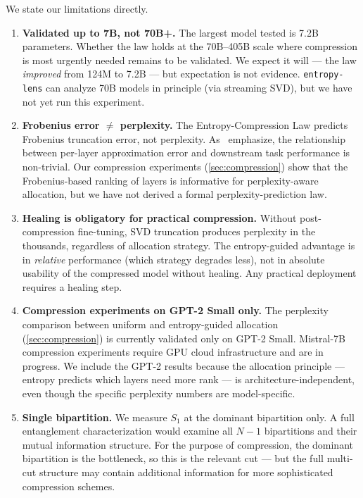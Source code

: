 \documentclass[11pt,a4paper]{article}
\newcommand{\Svn}{S_1}
\begin{document}
We state our limitations directly.

\begin{enumerate}[leftmargin=2em, itemsep=3pt]
  \item \textbf{Validated up to 7B, not 70B+.}
    The largest model tested is 7.2B parameters.  Whether the law
    holds at the 70B--405B scale where compression is most urgently
    needed remains to be validated.  We expect it will --- the law
    \emph{improved} from 124M to 7.2B --- but expectation is not
    evidence.  \texttt{entropy-lens} can analyze 70B models in
    principle (via streaming SVD), but we have not yet run this
    experiment.

  \item \textbf{Frobenius error $\neq$ perplexity.}
    The Entropy-Compression Law predicts Frobenius truncation error,
    not perplexity.  As~\citet{hsu2025rethinking} emphasize, the
    relationship between per-layer approximation error and downstream
    task performance is non-trivial.  Our compression experiments
    (\cref{sec:compression}) show that the Frobenius-based ranking
    of layers is informative for perplexity-aware allocation, but we
    have not derived a formal perplexity-prediction law.

  \item \textbf{Healing is obligatory for practical compression.}
    Without post-compression fine-tuning, SVD truncation produces
    perplexity in the thousands, regardless of allocation strategy.
    The entropy-guided advantage is in \emph{relative} performance
    (which strategy degrades less), not in absolute usability of the
    compressed model without healing.  Any practical deployment
    requires a healing step.

  \item \textbf{Compression experiments on GPT-2 Small only.}
    The perplexity comparison between uniform and entropy-guided
    allocation (\cref{sec:compression}) is currently validated only
    on GPT-2 Small.  Mistral-7B compression experiments require GPU
    cloud infrastructure and are in progress.  We include the GPT-2
    results because the allocation principle --- entropy predicts
    which layers need more rank --- is architecture-independent, even
    though the specific perplexity numbers are model-specific.

  \item \textbf{Single bipartition.}
    We measure $\Svn$ at the dominant bipartition only.  A full
    entanglement characterization would examine all $N-1$ bipartitions
    and their mutual information structure.  For the purpose of
    compression, the dominant bipartition is the bottleneck, so this
    is the relevant cut --- but the full multi-cut structure may
    contain additional information for more sophisticated compression
    schemes.


\end{enumerate}
\end{document}

